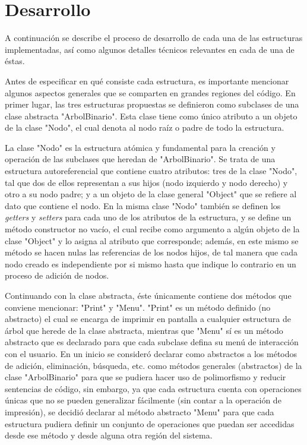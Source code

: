 \documentclass[letterpaper, 11pt]{article}
\begin{document}
	\section*{\centering Desarrollo}
	
	A continuación se describe el proceso de desarrollo de cada una de las estructuras implementadas, así como algunos detalles técnicos relevantes en cada de una de éstas.
	
	Antes de especificar en qué consiste cada estructura, es importante mencionar algunos aspectos generales que se comparten en grandes regiones del código. En primer lugar, las tres estructuras propuestas se definieron como subclases de una clase abstracta "ArbolBinario". Esta clase tiene como único atributo a un objeto de la clase "Nodo", el cual denota al nodo raíz o padre de todo la estructura.
	
	La clase "Nodo" es la estructura atómica y fundamental para la creación y operación de las subclases que heredan de "ArbolBinario". Se trata de una estructura autoreferencial que contiene cuatro atributos: tres de la clase "Nodo", tal que dos de ellos representan a sus hijos (nodo izquierdo y nodo derecho) y otro a su nodo padre; y a un objeto de la clase general "Object" que se refiere al dato que contiene el nodo. En la misma clase "Nodo" también se definen los \textit{getters} y \textit{setters} para cada uno de los atributos de la estructura, y se define un método constructor no vacío, el cual recibe como argumento a algún objeto de la clase "Object" y lo asigna al atributo que corresponde; además, en este mismo se método se hacen nulas las referencias de los nodos hijos, de tal manera que cada nodo creado es independiente por si mismo hasta que indique lo contrario en un proceso de adición de nodos. 
	
	Continuando con la clase abstracta, éste únicamente contiene dos métodos que conviene mencionar: "Print" y "Menu". "Print" es un método definido (no abstracto) el cual se encarga de imprimir en pantalla a cualquier estructura de árbol que herede de la clase abstracta, mientras que "Menu" sí es un método abstracto que es declarado para que cada subclase defina su menú de interacción con el usuario. En un inicio se consideró declarar como abstractos a los métodos de adición, eliminación, búsqueda, etc. como métodos generales (abstractos) de la clase "ArbolBinario" para que se pudiera hacer uso de polimorfismo y reducir sentencias de código, sin embargo, ya que cada estructura cuenta con operaciones únicas que no se pueden generalizar fácilmente (sin contar a la operación de impresión), se decidió declarar al método abstracto "Menu" para que cada estructura pudiera definir un conjunto de operaciones que puedan ser accedidas desde ese método y desde alguna otra región del sistema. \\
	
\end{document}
